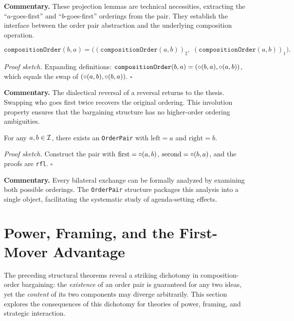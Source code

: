 \medskip

\noindent\textbf{Commentary.}
These projection lemmas are technical necessities, extracting the ``$a$-goes-first''
and ``$b$-goes-first'' orderings from the pair.  They establish the interface
between the order pair abstraction and the underlying composition operation.

\begin{theorem}
\label{thm:order_swap_involution}
\[
  \texttt{compositionOrder}(b, a) =
  \bigl((\texttt{compositionOrder}(a, b))_2,\;
  (\texttt{compositionOrder}(a, b))_1\bigr).
\]
\end{theorem}

\noindent\textit{Proof sketch.}\quad
Expanding definitions: $\texttt{compositionOrder}(b,a) = (\circ(b,a),
\circ(a,b))$, which equals the swap of $(\circ(a,b), \circ(b,a))$.
\hfill$\square$

\medskip

\noindent\textbf{Commentary.}
The dialectical reversal of a reversal returns to the thesis.  Swapping who
goes first twice recovers the original ordering.  This involution property
ensures that the bargaining structure has no higher-order ordering ambiguities.

\begin{theorem}
\label{thm:order_pair_exists}
For any $a, b \in \mathcal{I}$, there exists an \texttt{OrderPair} with
$\text{left} = a$ and $\text{right} = b$.
\end{theorem}

\noindent\textit{Proof sketch.}\quad
Construct the pair with $\text{first} = \circ(a,b)$,
$\text{second} = \circ(b,a)$, and the proofs are \texttt{rfl}.
\hfill$\square$

\medskip

\noindent\textbf{Commentary.}
Every bilateral exchange can be formally analyzed by examining both possible
orderings.  The \texttt{OrderPair} structure packages this analysis into a
single object, facilitating the systematic study of agenda-setting effects.

\section{Power, Framing, and the First-Mover Advantage}
\label{sec:ch17-power}

The preceding structural theorems reveal a striking dichotomy in
composition-order bargaining: the \emph{existence} of an order pair is
guaranteed for any two ideas, yet the \emph{content} of its two components
may diverge arbitrarily.  This section explores the consequences of this
dichotomy for theories of power, framing, and strategic interaction.

